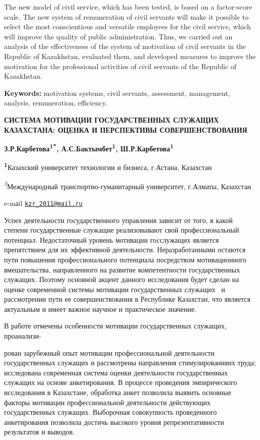 The new model of civil service, which has been tested, is based on a
factor-score scale. The new system of remuneration of civil servants
will make it possible to select the most conscientious and versatile
employees for the civil service, which will improve the quality of
public administration. Thus, we carried out an analysis of the
effectiveness of the system of motivation of civil servants in the
Republic of Kazakhstan, evaluated them, and developed measures to
improve the motivation for the professional activities of civil servants
of the Republic of Kazakhstan.

{\bfseries Keywords:} motivation systems, civil servants, assessment,
management, analysis, remuneration, efficiency.

\begin{center}
{\large\bfseries СИСТЕМА МОТИВАЦИИ ГОСУДАРСТВЕННЫХ СЛУЖАЩИХ КАЗАХСТАНА: ОЦЕНКА И
ПЕРСПЕКТИВЫ СОВЕРШЕНСТВОВАНИЯ}

{\bfseries З.Р.Карбетова\textsuperscript{1*},
А.С.Бактымбет\textsuperscript{1}, Ш.Р.Карбетова\textsuperscript{1}}

{\bfseries \textsuperscript{1}}Казахский университет технологии и бизнеса,
г.Астана, Казахстан

\emph{\textsuperscript{2}}Международный транспортно-гуманитарный
университет, г.Алматы, Казахстан

e-mаil \href{mailto:kzr_2011@mail.ru}{\nolinkurl{kzr\_2011@mail.ru}}
\end{center}

Успех деятельности государственного управления зависит от того, в какой
степени государственные служащие реализовывают свой профессиональный
потенциал. Недостаточный уровень мотивации госслужащих является
препятствием для их эффективной деятельности. Неразработанными остаются
пути повышения профессионального потенциала посредством мотивационного
вмешательства, направленного на развитие компетентности государственных
служащих. Поэтому основной акцент данного исследования будет сделан на
оценке современной системы мотивации государственных служащих~ и
рассмотрении пути ее совершенствования в Республике Казахстан, что
является актуальным и имеет важное научное и практическое значение.

В работе отмечены особенности мотивации государственных служащих,
проанализи-

рован зарубежный опыт мотивации профессиональной деятельности
государственных служащих и рассмотрены направления стимулированияих
труда; исследована современная система оценки деятельности
государственных служащих на основе анкетирования. В процессе проведения
эмпирического исследования в Казахстане, обработка анкет позволила
выявить основные факторы мотивации профессиональной деятельности
действующих государственных служащих. Выборочная совокупность
проведенного анкетирования позволила достичь высокого уровня репрезентативности результатов и выводов.

